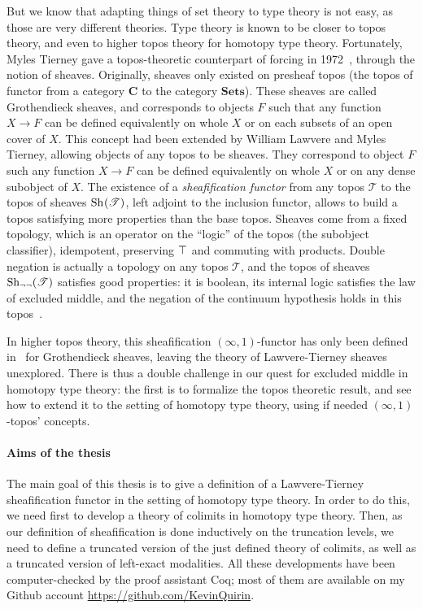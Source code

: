 But we know that adapting things of set theory to type theory is not
easy, as those are very different theories. Type theory is known to be
closer to topos theory, and even to higher topos theory for homotopy
type theory. 
Fortunately, Myles Tierney gave a topos-theoretic counterpart of
forcing in 1972~\cite{tierney1972}, through the notion of
sheaves. Originally, sheaves only existed on presheaf topos (the
topos of functor from a category $\mathbf C$ to the category
$\mathbf{Sets}$). These sheaves are called Grothendieck sheaves, and
corresponds to objects $F$ such that any function $X\to F$ can be
defined equivalently on whole $X$ or on each subsets of an open cover
of $X$.
This concept had been extended by William Lawvere and Myles Tierney,
allowing objects of any topos to be sheaves. They correspond to object
$F$ such any function $X \to F$ can be defined equivalently on whole
$X$ or on any dense subobject of $X$.
The existence of a {\em sheafification functor} from any topos
$\mathcal T$ to the topos of sheaves $\mathrm{Sh}_{}(\mathcal T)$, left adjoint
to the inclusion functor, allows to build a topos satisfying more
properties than the base topos. 
Sheaves come from a fixed topology, which is an operator on the
``logic'' of the topos (the subobject classifier), idempotent,
preserving $\top$ and commuting with products. Double negation is
actually a topology on any topos $\mathcal T$, and the topos of
sheaves $\mathrm{Sh}_{\lnot\lnot}(\mathcal T)$ satisfies good properties: it is
boolean, \ie{} its internal logic satisfies the law of excluded
middle, and the negation of the continuum hypothesis holds in this
topos~\cite{maclanemoerdijk}.

In higher topos theory, this sheafification $(\infty,1)$-functor has
only been defined in~\cite{lurie} for Grothendieck sheaves, leaving
the theory of Lawvere-Tierney sheaves unexplored. There is thus a
double challenge in our quest for excluded middle in homotopy type
theory: the first is to formalize the topos theoretic result, and see
how to extend it to the setting of homotopy type theory, using if
needed $(\infty,1)$-topos' concepts.

\paragraph*{Aims of the thesis} The main goal of this thesis is to
give a definition of a Lawvere-Tierney sheafification functor in the
setting of homotopy type theory. In order to do this, we need first to develop a theory of colimits in homotopy type theory. Then, as our definition of sheafification is done inductively
on the truncation levels, we need to define a truncated version of the
just defined theory of colimits, as well as a truncated version of
left-exact modalities.  All these developments have been
computer-checked by the proof assistant Coq; most of them are
available on my Github account \url{https://github.com/KevinQuirin}.

